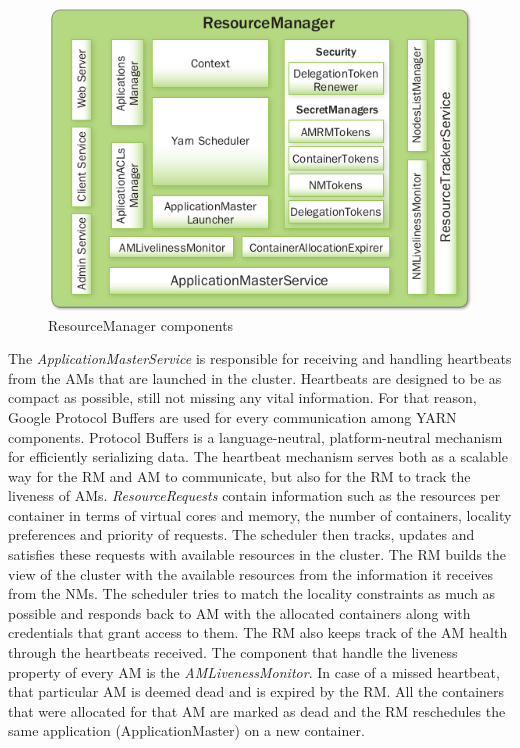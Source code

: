 \begin{figure}
\centering
\includegraphics[scale=0.6]{resources/images/Background/RM_components.png}
\caption{ResourceManager components \cite{Murthy:2014:AHY:2636998}}
\label{fig:yarn_RM_components}
\end{figure}

The \emph{ApplicationMasterService} is responsible for receiving and
handling heartbeats from the AMs that are launched in the
cluster. Heartbeats are designed to be as compact as possible, still
not missing any vital information. For that reason, Google Protocol
Buffers \cite{proto_buf} are used for every communication among YARN
components. Protocol Buffers is a language-neutral, platform-neutral
mechanism for efficiently serializing data. The heartbeat mechanism
serves both as a scalable way for the RM and AM to communicate, but
also for the RM to track the liveness of AMs. \emph{ResourceRequests}
contain information such as the resources per container in terms of
virtual cores and memory, the number of containers, locality
preferences and priority of requests. The scheduler then tracks,
updates and satisfies these requests with available resources in the
cluster. The RM builds the view of the cluster with the available
resources from the information it receives from the NMs. The scheduler
tries to match the locality constraints as much as possible and
responds back to AM with the allocated containers along with
credentials that grant access to them. The RM also keeps track of the
AM health through the heartbeats received. The component that handle
the liveness property of every AM is the \emph{AMLivenessMonitor}. In
case of a missed heartbeat, that particular AM is deemed dead and
is expired by the RM. All the containers that were allocated for
that AM are marked as dead and the RM reschedules the same application
(ApplicationMaster) on a new container.

